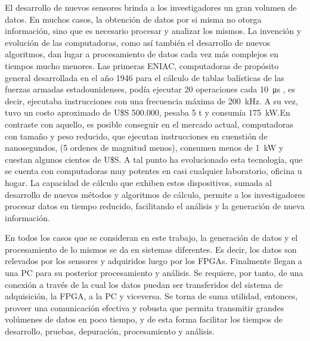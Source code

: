 El desarrollo de nuevos sensores brinda a los investigadores un gran volumen de datos. En muchos casos, la obtención de datos por si misma no otorga información, sino que es necesario procesar y analizar los mismos. La invención y evolución de las computadoras, como así también el desarrollo de nuevos algoritmos, dan lugar a procesamiento de datos cada vez más complejos en tiempos mucho menores.
Las primeras ENIAC, computadoras de propósito general desarrollada en el año 1946 para el cálculo de tablas balísticas de las fuerzas armadas estadounidenses, podía ejecutar 20 operaciones cada \SI{10}{\micro\second} \cite{Goldstine1946}, es decir, ejecutaba instrucciones con una frecuencia máxima de \SI{200}{\kilo\hertz}. A su vez, tuvo un costo aproximado de U\$S 500.000, pesaba 5 t y consumía \SI{175}{\kilo\watt}.En contraste con aquello, es posible conseguir en el mercado actual, computadoras con tamaño y peso reducido, que ejecutan instrucciones en cuenstión de nanosegundos, (5 ordenes de magnitud menos), consumen menos de \SI{1}{\kilo\watt} y cuestan algunos cientos de U\$S. A tal punto ha evolucionado esta tecnología, que se cuenta con computadoras muy potentes en casi cualquier laboratorio, oficina u hogar. La capacidad de cálculo que exhiben estos dispositivos, sumada al desarrollo de nuevos métodos y algoritmos de cálculo, permite a los investigadores procesar datos en tiempo reducido, facilitando el análisis y la generación de nueva información.%

En todos los casos que se consideran en este trabajo, la generación de datos y el procesamiento de lo mismos se da en sistemas diferentes. Es decir, los datos son relevados por los sensores y adquiridos luego por los FPGAs. Finalmente llegan a una PC para su posterior procesamiento y análisis. Se requiere, por tanto, de una conexión a través de la cual los datos puedan ser transferidos del sistema de adquisición, la FPGA, a la PC y viceversa. Se torna de suma utilidad, entonces, proveer una comunicación efectiva y robusta que permita transmitir grandes volúmenes de datos en poco tiempo, y de esta forma facilitar los tiempos de desarrollo, pruebas, depuración, procesamiento y análisis.%


